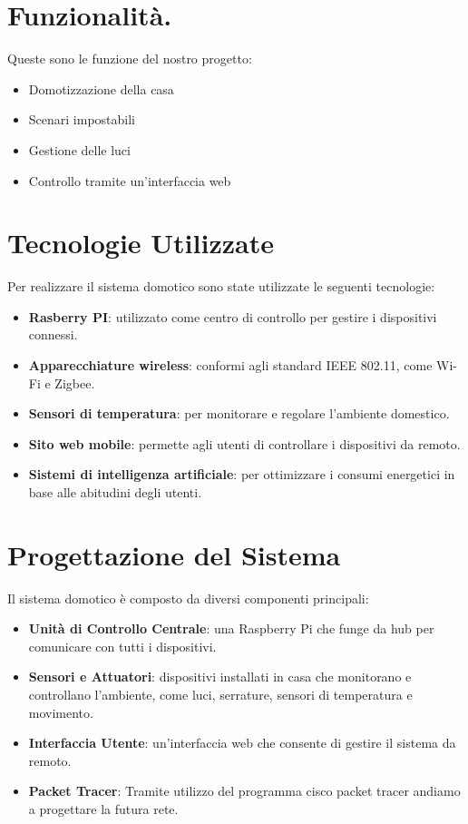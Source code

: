 \documentclass[a4paper,12pt]{article}
\begin{document}
\section{Funzionalità.}
Queste sono le funzione del nostro progetto:
\begin{itemize}
    \item Domotizzazione della casa
    \item Scenari impostabili
    \item Gestione delle luci 
    \item Controllo tramite un'interfaccia web 
\end{itemize}

\section{Tecnologie Utilizzate}
Per realizzare il sistema domotico sono state utilizzate le seguenti tecnologie:
\begin{itemize}
    \item \textbf{Rasberry PI}: utilizzato come centro di controllo per gestire i dispositivi connessi.
    \item \textbf{Apparecchiature wireless}: conformi agli standard IEEE 802.11, come Wi-Fi e Zigbee.
    \item \textbf{Sensori di temperatura}: per monitorare e regolare l'ambiente domestico.
    \item \textbf{Sito web mobile}:  permette agli utenti di controllare i dispositivi da remoto.
    \item \textbf{Sistemi di intelligenza artificiale}: per ottimizzare i consumi energetici in base alle abitudini degli utenti.
\end{itemize}

\section{Progettazione del Sistema}
Il sistema domotico è composto da diversi componenti principali:
\begin{itemize}
    \item \textbf{Unità di Controllo Centrale}: una Raspberry Pi che funge da hub per comunicare con tutti i dispositivi.
    \item \textbf{Sensori e Attuatori}: dispositivi installati in casa che monitorano e controllano l'ambiente, come luci, serrature, sensori di temperatura e movimento.
    \item \textbf{Interfaccia Utente}: un'interfaccia web che consente di gestire il sistema da remoto.
    \item \textbf{Packet Tracer}: Tramite utilizzo del programma cisco packet tracer andiamo a progettare la futura rete.
\end{itemize}
\end{document}
